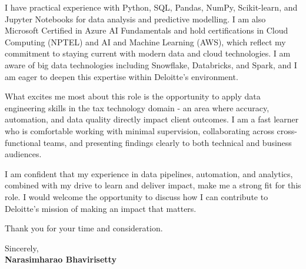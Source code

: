 \documentclass[11pt]{article}
\begin{document}
I have practical experience with Python, SQL, Pandas, NumPy, Scikit-learn, and Jupyter Notebooks for data analysis and predictive modelling. I am also Microsoft Certified in Azure AI Fundamentals and hold certifications in Cloud Computing (NPTEL) and AI and Machine Learning (AWS), which reflect my commitment to staying current with modern data and cloud technologies. I am aware of big data technologies including Snowflake, Databricks, and Spark, and I am eager to deepen this expertise within Deloitte's environment.

What excites me most about this role is the opportunity to apply data engineering skills in the tax technology domain - an area where accuracy, automation, and data quality directly impact client outcomes. I am a fast learner who is comfortable working with minimal supervision, collaborating across cross-functional teams, and presenting findings clearly to both technical and business audiences.

I am confident that my experience in data pipelines, automation, and analytics, combined with my drive to learn and deliver impact, make me a strong fit for this role. I would welcome the opportunity to discuss how I can contribute to Deloitte's mission of making an impact that matters.

Thank you for your time and consideration.

\vspace{16pt}

Sincerely,\\[4pt]
\textbf{Narasimharao Bhavirisetty}
\end{document}

